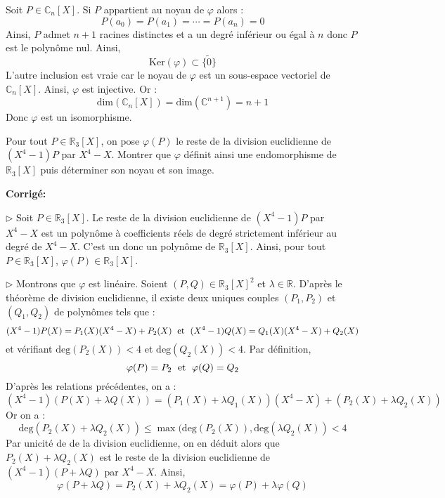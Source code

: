 \documentclass[a4paper,twoside,french,11pt]{VcCours}
\newcommand{\corr}{\textbf{Corrigé:}}
\begin{document}
\noindent Soit $P \in \mathbb{C}_n[X]$. Si $P$ appartient au noyau de $\varphi$ alors :
$$ P(a_0) = P(a_1) = \cdots = P(a_n) = 0$$
Ainsi, $P$ admet $n+1$ racines distinctes et a un degré inférieur ou égal à $n$ donc $P$ est le polynôme nul. Ainsi,
$$ \textrm{Ker}(\varphi) \subset \lbrace \tilde{0} \rbrace$$
L'autre inclusion est vraie car le noyau de $\varphi$ est un sous-espace vectoriel de $\mathbb{C}_n[X]$. Ainsi, $\varphi$ est injective. Or :
$$ \textrm{dim}(\mathbb{C}_n[X]) = \textrm{dim}(\mathbb{C}^{n+1}) = n+1$$
Donc $\varphi$ est un isomorphisme.



\begin{Exercice}{} Pour tout $P \in \mathbb{R}_3[X]$, on pose $\varphi(P)$ le reste de la division euclidienne de $(X^4-1)P$ par $X^4-X$. Montrer que $\varphi$ définit ainsi une endomorphisme de $\mathbb{R}_3[X]$ puis déterminer son noyau et son image.
\end{Exercice} 

\corr 



\noindent $\rhd$ Soit $P\in \mathbb{R}_3[X]$. Le reste de la division euclidienne de $(X^4-1)P$ par $X^4-X$ est un polynôme à coefficients réels de degré strictement inférieur au degré de $X^4-X$. C'est un donc un polynôme de $\mathbb{R}_3[X]$. Ainsi, pour tout $P \in \mathbb{R}_3[X]$, $\varphi(P) \in \mathbb{R}_3[X]$.



\noindent $\rhd$ Montrons que $\varphi$ est linéaire. Soient $(P,Q) \in \mathbb{R}_3[X]^2$ et $\lambda \in \mathbb{R}$. D'après le théorème de division euclidienne, il existe deux uniques couples $(P_1,P_2)$ et $(Q_1,Q_2)$ de polynômes tels que :
$$ (X^4-1)P(X) = P_1(X)(X^4-X)+ P_2(X) \; \hbox{ et } \; (X^4-1)Q(X) = Q_1(X)(X^4-X)+ Q_2(X)$$
et vérifiant $\textrm{deg}(P_2(X))<4$ et $\textrm{deg}(Q_2(X))<4$. Par définition,
$$ \varphi(P)= P_2 \; \hbox{ et } \; \varphi(Q) = Q_2$$
D'après les relations précédentes, on a :
$$ (X^4-1)(P(X) + \lambda Q(X))  = (P_1(X)+ \lambda Q_1(X))(X^4-X) + (P_2(X)+ \lambda Q_2(X))$$
Or on a :
$$ \textrm{deg}(P_2(X)+ \lambda Q_2(X)) \leq \max(\textrm{deg}(P_2(X)), \textrm{deg}(\lambda Q_2(X))<4$$
Par unicité de de la division euclidienne, on en déduit alors que $P_2(X)+ \lambda Q_2(X)$ est le reste de la division euclidienne de $(X^4-1)(P+ \lambda Q)$ par $X^4-X$. Ainsi,
 $$\varphi(P + \lambda Q) = P_2(X)+ \lambda Q_2(X) = \varphi(P) + \lambda \varphi(Q)$$

\noindent 
\end{document}
